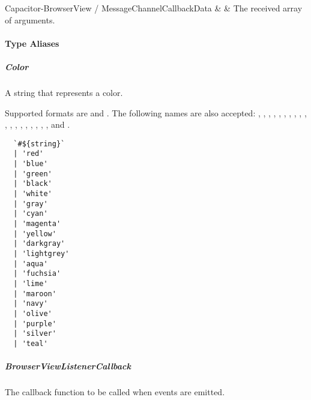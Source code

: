 \begin{interfacedesc}{Capacitor-BrowserView / MessageChannelCallbackData}
   &  & The received array of arguments. \\ \hline
\end{interfacedesc}

\newpage

\paragraph{Type Aliases}


\subparagraph{Color}

A string that represents a color.

Supported formats are  and . The following names are also accepted: , , , , , ,
, , , , , , , , , , , , , and .

\begin{verbatim}
  `#${string}`
  | 'red'
  | 'blue'
  | 'green'
  | 'black'
  | 'white'
  | 'gray'
  | 'cyan'
  | 'magenta'
  | 'yellow'
  | 'darkgray'
  | 'lightgrey'
  | 'aqua'
  | 'fuchsia'
  | 'lime'
  | 'maroon'
  | 'navy'
  | 'olive'
  | 'purple'
  | 'silver'
  | 'teal'
\end{verbatim}

\subparagraph{BrowserViewListenerCallback}

The callback function to be called when events are emitted.

